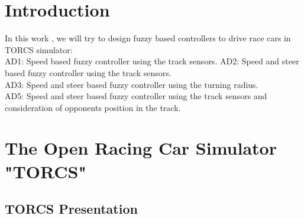 \documentclass{llncs}
\begin{document}
%
%
%
\vspace{1cm}
%


\begin{abstract}
\end{abstract}
\section{Introduction}

In this work , we will try to design fuzzy based controllers to drive race cars in TORCS simulator:\\
AD1: Speed  based fuzzy controller using the track sensors.
AD2: Speed and steer based fuzzy controller using the track sensors.\\
AD3: Speed and steer based fuzzy controller using the turning radius.\\
AD5: Speed and steer based fuzzy controller using the track sensors and consideration of opponents position in the track.

\section{The Open Racing Car Simulator "TORCS"}
\subsection{TORCS Presentation}
\end{document}

